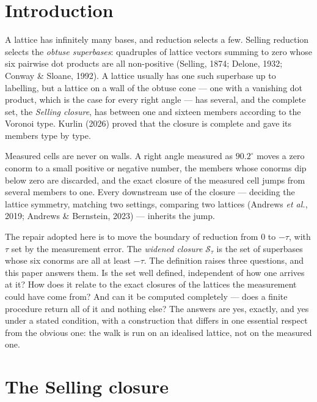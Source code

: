 \documentclass[preprint,pdf]{iucr}          %
\newcommand{\Sw}{\mathcal{S}_\tau}
\begin{document}
\section{Introduction}

A lattice has infinitely many bases, and reduction selects a few. Selling reduction selects the \emph{obtuse superbases}: quadruples of lattice vectors summing to zero whose six pairwise dot products are all non-positive (Selling, 1874; Delone, 1932; Conway \& Sloane, 1992). A lattice usually has one such superbase up to labelling, but a lattice on a wall of the obtuse cone --- one with a vanishing dot product, which is the case for every right angle --- has several, and the complete set, the \emph{Selling closure}, has between one and sixteen members according to the Voronoi type. Kurlin (2026) proved that the closure is complete and gave its members type by type.

Measured cells are never on walls. A right angle measured as $90.2^\circ$ moves a zero conorm to a small positive or negative number, the members whose conorms dip below zero are discarded, and the exact closure of the measured cell jumps from several members to one. Every downstream use of the closure --- deciding the lattice symmetry, matching two settings, comparing two lattices (Andrews \emph{et al.}, 2019; Andrews \& Bernstein, 2023) --- inherits the jump.

The repair adopted here is to move the boundary of reduction from $0$ to $-\tau$, with $\tau$ set by the measurement error. The \emph{widened closure} $\Sw$ is the set of superbases whose six conorms are all at least $-\tau$. The definition raises three questions, and this paper answers them. Is the set well defined, independent of how one arrives at it? How does it relate to the exact closures of the lattices the measurement could have come from? And can it be computed completely --- does a finite procedure return all of it and nothing else? The answers are yes, exactly, and yes under a stated condition, with a construction that differs in one essential respect from the obvious one: the walk is run on an idealised lattice, not on the measured one.

\section{The Selling closure}
\label{sec:closure}
\end{document}
